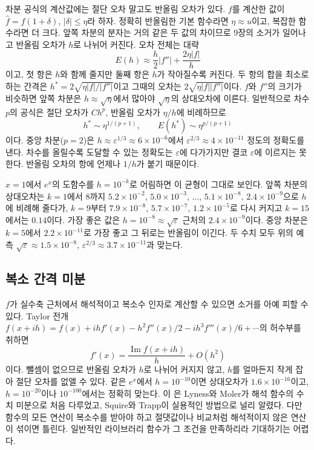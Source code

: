 차분 공식의 계산값에는 절단 오차 말고도 반올림 오차가 있다. $f$를 계산한 값이 $\hat f=f(1+\delta)$, $|\delta|\le\eta$라 하자. 정확히 반올림한 기본 함수라면 $\eta\approx u$이고, 복잡한 함수라면 더 크다. 앞쪽 차분의 분자는 거의 같은 두 값의 차이므로 9장의 소거가 일어나고 반올림 오차가 $h$로 나뉘어 커진다. 오차 전체는 대략
\begin{equation}
\label{eq:fd-total-error}
E(h)\approx\frac h2|f''|+\frac{2\eta|f|}h
\end{equation}
이고, 첫 항은 $h$와 함께 줄지만 둘째 항은 $h$가 작아질수록 커진다. 두 항의 합을 최소로 하는 간격은 $h^\ast=2\sqrt{\eta|f|/|f''|}$이고 그때의 오차는 $2\sqrt{\eta|f||f''|}$이다. $f$와 $f''$의 크기가 비슷하면 앞쪽 차분은 $h\approx\sqrt\eta$에서 많아야 $\sqrt\eta$의 상대오차에 이른다. 일반적으로 차수 $p$의 공식은 절단 오차가 $Ch^p$, 반올림 오차가 $\eta/h$에 비례하므로
\[
h^\ast\sim\eta^{1/(p+1)},\qquad E(h^\ast)\sim\eta^{p/(p+1)}
\]
이다. 중앙 차분($p=2$)은 $h\approx\varepsilon^{1/3}\approx6\times10^{-6}$에서 $\varepsilon^{2/3}\approx4\times10^{-11}$ 정도의 정확도를 낸다. 차수를 올릴수록 도달할 수 있는 정확도는 $\varepsilon$에 다가가지만 결코 $\varepsilon$에 이르지는 못한다. 반올림 오차의 항에 언제나 $1/h$가 붙기 때문이다.

$x=1$에서 $e^x$의 도함수를 $h=10^{-k}$로 어림하면 이 균형이 그대로 보인다. 앞쪽 차분의 상대오차는 $k=1$에서 $8$까지 $5.2\times10^{-2}$, $5.0\times10^{-3}$, $\dots$, $5.1\times10^{-8}$, $2.4\times10^{-9}$으로 $h$에 비례해 줄다가, $k=9$부터 $7.9\times10^{-8}$, $5.7\times10^{-7}$, $1.2\times10^{-5}$로 다시 커지고 $k=15$에서는 $0.14$이다. 가장 좋은 값은 $h=10^{-8}\approx\sqrt\varepsilon$ 근처의 $2.4\times10^{-9}$이다. 중앙 차분은 $k=5$에서 $2.2\times10^{-11}$로 가장 좋고 그 뒤로는 반올림이 이긴다. 두 수치 모두 위의 예측 $\sqrt\varepsilon\approx1.5\times10^{-8}$, $\varepsilon^{2/3}\approx3.7\times10^{-11}$과 맞는다.

\subsection{복소 간격 미분}

$f$가 실수축 근처에서 해석적이고 복소수 인자로 계산할 수 있으면 소거를 아예 피할 수 있다. Taylor 전개 $f(x+ih)=f(x)+ihf'(x)-h^2f''(x)/2-ih^3f'''(x)/6+\cdots$의 허수부를 취하면
\[
f'(x)=\frac{\operatorname{Im}f(x+ih)}h+O(h^2)
\]
이다. 뺄셈이 없으므로 반올림 오차가 $h$로 나뉘어 커지지 않고, $h$를 얼마든지 작게 잡아 절단 오차를 없앨 수 있다. 같은 $e^x$에서 $h=10^{-10}$이면 상대오차가 $1.6\times10^{-16}$이고, $h=10^{-20}$이나 $10^{-100}$에서는 정확히 맞는다. 이 은 Lyness와 Moler가 해석 함수의 수치 미분으로 처음 다루었고\cite{lyness1967}, Squire와 Trapp이 실용적인 방법으로 널리 알렸다\cite{squire1998,martins2003}. 다만 함수의 모든 연산이 복소수를 받아야 하고 절댓값이나 비교처럼 해석적이지 않은 연산이 섞이면 틀린다. 일반적인 라이브러리 함수가 그 조건을 만족하리라 기대하기는 어렵다.

